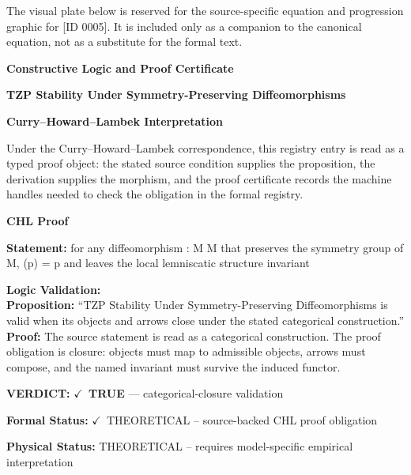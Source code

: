 \begingroup\footnotesize\sloppy
The visual plate below is reserved for the source-specific equation and progression graphic for [ID 0005]. It is included only as a companion to the canonical equation, not as a substitute for the formal text.
\par\endgroup
\ifTZPDarkEdition
{}
\fi

\clearpage
\begingroup\tzpsupportsetup
\noindent\textbf{\fontsize{10.8pt}{12.8pt}\selectfont [ID 0005] Constructive Logic and Proof Certificate}\par
\noindent\textbf{\fontsize{10pt}{12pt}\selectfont TZP Stability Under Symmetry-Preserving Diffeomorphisms}\par
\vspace{0.45em}
\begingroup
\footnotesize
\setlength{\parskip}{0.22em}
\setlength{\parindent}{0pt}
\noindent\textbf{Curry--Howard--Lambek Interpretation}\par
Under the Curry--Howard--Lambek correspondence, this registry entry is read as a typed proof
object: the stated source condition supplies the proposition, the derivation supplies the
morphism, and the proof certificate records the machine handles needed to check the obligation
in the formal registry.

\vspace{0.45em}
\noindent\textbf{CHL Proof}\par
\textbf{Statement:} for any diffeomorphism : M M that preserves the symmetry group of M, (p) = p and
 leaves the local lemniscatic structure invariant

\textbf{Logic Validation:}\\
\textbf{Proposition:} ``TZP Stability Under Symmetry-Preserving Diffeomorphisms is valid when its objects and
arrows close under the stated categorical construction.''\\
\textbf{Proof:} The source statement is read as a categorical construction. The proof obligation is
closure: objects must map to admissible objects, arrows must compose, and the named
invariant must survive the induced functor.

\textbf{VERDICT:} \ensuremath{\checkmark}\ \textbf{TRUE} --- categorical-closure validation

\textbf{Formal Status:} \ensuremath{\checkmark}\ THEORETICAL -- source-backed CHL proof obligation

\textbf{Physical Status:} THEORETICAL -- requires model-specific empirical interpretation
\par\vspace{0.45em}
\par
\ifTZPDarkEdition
{}
\fi
\endgroup
\endgroup
